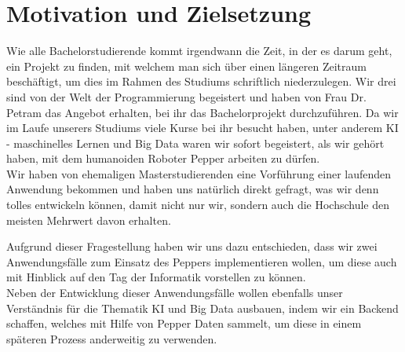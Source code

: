 \chapter{Motivation und Zielsetzung}
\label{sec:Motivation-und-Zielsetzung}

Wie alle Bachelorstudierende kommt irgendwann die Zeit, in der es darum geht, ein Projekt
zu finden, mit welchem man sich über einen längeren Zeitraum beschäftigt, um dies im Rahmen
des Studiums schriftlich niederzulegen. Wir drei sind von der Welt der Programmierung begeistert
und haben von Frau Dr. Petram das Angebot erhalten, bei ihr das Bachelorprojekt durchzuführen.
Da wir im Laufe unserers Studiums viele Kurse bei ihr besucht haben, unter anderem
\grqq{}KI - maschinelles Lernen\grqq{} und \grqq{}Big Data\grqq{} waren wir sofort begeistert, als wir
gehört haben, mit dem humanoiden Roboter Pepper arbeiten zu dürfen.\\

Wir haben von ehemaligen Masterstudierenden eine Vorführung einer laufenden Anwendung bekommen und haben
uns natürlich direkt gefragt, was wir denn tolles entwickeln können, damit nicht nur wir, sondern auch die
Hochschule den meisten Mehrwert davon erhalten.

Aufgrund dieser Fragestellung haben wir uns dazu entschieden, dass wir zwei Anwendungsfälle zum Einsatz des
Peppers implementieren wollen, um diese auch mit Hinblick auf den Tag der Informatik vorstellen zu können.\\

Neben der Entwicklung dieser Anwendungsfälle wollen ebenfalls unser Verständnis für die Thematik KI und
Big Data ausbauen, indem wir ein Backend schaffen, welches mit Hilfe von Pepper Daten sammelt, um diese in
einem späteren Prozess anderweitig zu verwenden.